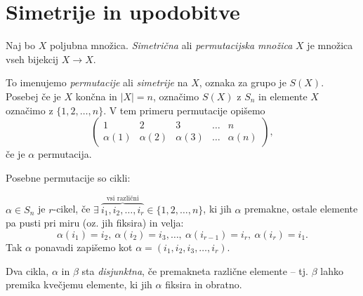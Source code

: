 \chapter{Simetrije in upodobitve}

\begin{defin}
	Naj bo $X$ poljubna mno\v zica. \emph{Simetri\v cna} ali \emph{permutacijska mno\v zica} $X$ je mno\v zica vseh bijekcij
	$X \to X$.\vspace{2ex}

	\ni To imenujemo \emph{permutacije} ali \emph{simetrije} na $X$, oznaka za grupo je $S(X)$. Posebej \v ce je $X$ kon\v cna in
	$|X| = n$, ozna\v cimo $S(X)$ z $S_n$ in elemente $X$ ozna\v cimo z $\{1, 2, \ldots, n\}$. V tem primeru permutacije opi\v semo
	\[
		\begin{pmatrix}
			1 & 2 & 3 & \ldots & n \\
			\alpha(1) & \alpha(2) & \alpha(3) & \ldots & \alpha (n)
		\end{pmatrix},
	\]
	\v ce je $\alpha$ permutacija.
\end{defin}

\ni Posebne permutacije so cikli:

\begin{defin}
	$\alpha \in S_n$ je $r$-cikel, \v ce $\exists\ \overbrace{i_1, i_2, \ldots, i_r}^{\text{vsi razli\v cni}} \in \{1, 2, \ldots, n\}$, ki jih
	$\alpha$ premakne, ostale elemente pa pusti pri miru (oz. jih fiksira) in velja:
	\[
		\alpha (i_1) = i_2,\ \alpha(i_2) = i_3, \ldots,\ \alpha(i_{r-1}) = i_r,\ \alpha(i_r) = i_1.
	\]
	Tak $\alpha$ ponavadi zapi\v semo kot $\alpha = (i_1, i_2, i_3, \ldots, i_r)$.
\end{defin}

\begin{defin}
	Dva cikla, $\alpha$ in $\beta$ sta \emph{disjunktna}, \v ce premakneta razli\v cne elemente -- tj. $\beta$ lahko premika kve\v cjemu
	elemente, ki jih $\alpha$ fiksira in obratno.
\end{defin}

